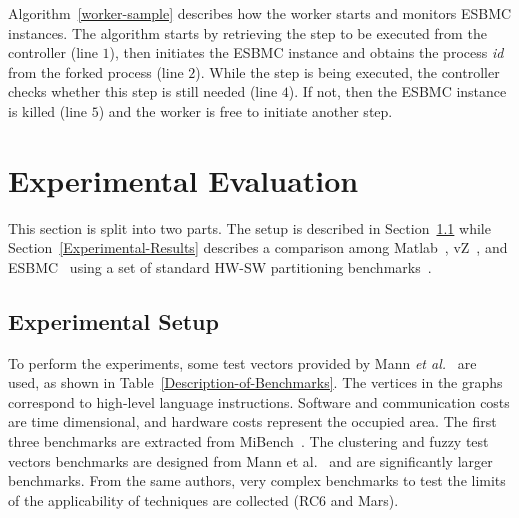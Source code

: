 Algorithm~\ref{worker-sample} describes how the worker starts and monitors ESBMC instances. The algorithm starts by retrieving the step to be executed from the controller (line $1$), then initiates the ESBMC instance and obtains the process \textit{id} from the forked process (line $2$). While the step is being executed, the controller checks whether this step is still needed (line $4$). If not, then the ESBMC instance is killed (line $5$) and the worker is free to initiate another step.


\section{Experimental Evaluation}
\label{Experimental-Evaluation}

This section is split into two parts. The setup is described in Section~\ref{Experimental-Setup} while Section~\ref{Experimental-Results} describes a comparison among Matlab~\cite{TheMathWorks2013}, vZ~\cite{Bjorner2015}, and ESBMC~\cite{Trindade2015} using a set of standard HW-SW partitioning benchmarks~\cite{Mann2007}.

\subsection{Experimental Setup}
\label{Experimental-Setup}

To perform the experiments, some test vectors provided by Mann {\it et al.}~\cite{Mann2007} are used, as shown in Table~\ref{Description-of-Benchmarks}. The vertices in the graphs correspond to high-level language instructions. Software and communication costs are time dimensional, and hardware costs represent the occupied area. The first three benchmarks are extracted from MiBench~\cite{Guthaus2001}. The clustering and fuzzy test vectors benchmarks are designed from Mann et al.~\cite{Mann2007} and are significantly larger benchmarks. From the same authors,  very complex benchmarks to test the limits of the applicability of techniques are collected (RC$6$ and Mars).

